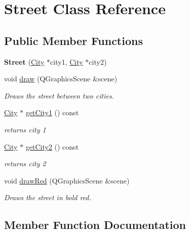 \hypertarget{class_street}{}\section{Street Class Reference}
\label{class_street}
\subsection*{Public Member Functions}
\begin{DoxyCompactItemize}
\item 
\mbox{\label{class_street_a6b46b32e856030ff31d09ff0011e25e4}} 
{\bfseries Street} (\hyperlink{class_city}{City} $\ast$city1, \hyperlink{class_city}{City} $\ast$city2)
\item 
void \hyperlink{class_street_a8a445d11dfb869969bea3b8f6e4a2edf}{draw} (Q\+Graphics\+Scene \&scene)
\begin{DoxyCompactList}\small\item\em Draws the street between two cities. \end{DoxyCompactList}\item 
\hyperlink{class_city}{City} $\ast$ \hyperlink{class_street_ab8d3699fb6ea3a4da8b1ca9b6b440db8}{get\+City1} () const
\begin{DoxyCompactList}\small\item\em returns city 1 \end{DoxyCompactList}\item 
\hyperlink{class_city}{City} $\ast$ \hyperlink{class_street_af0c8600437fb78a5def8793544970c8c}{get\+City2} () const
\begin{DoxyCompactList}\small\item\em returns city 2 \end{DoxyCompactList}\item 
void \hyperlink{class_street_a64316b1ab76eb572376f47fdb3f8fcc8}{draw\+Red} (Q\+Graphics\+Scene \&scene)
\begin{DoxyCompactList}\small\item\em Draws the street in bold red. \end{DoxyCompactList}\end{DoxyCompactItemize}


\subsection{Member Function Documentation}
\mbox{\label{class_street_a8a445d11dfb869969bea3b8f6e4a2edf}} 
